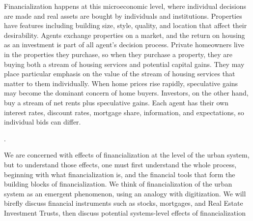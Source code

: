 Financialization happens at this microeconomic level, where individual decisions are made and real assets are bought by individuals and institutions. 
Properties have features including building size, style, quality, and location that affect their desirability. 
Agents exchange properties on a market,  
and the return on housing as an investment is part of all agent's decision process. 
Private homeowners live in the properties they purchase, so when they purchase a property, they are buying both a stream of housing services and potential capital gains. %
They may place particular emphasis on the value of the stream of housing services that matter to them individually. When home prices rise rapidly, speculative gains may become the dominant concern of home buyers. 
Investors, on the other hand, buy a stream of net rents plus speculative gains.
Each agent has their own interest rates, discount rates, mortgage share, information, and expectations, so individual bids can differ. 



.

We are concerned with  effects of financialization at the level of the urban system, but to understand those effects, one must first understand the whole process, beginning with what financialization is, and the financial tools that form the building blocks of financialization. 
We think of financialization of the urban system as an \gls{emergent} phenomenon, using an analogy with digitization. We will birefly discuss financial instruments such as stocks, mortgages, and Real Estate Investment Trusts, then discuss potential systems-level effects of financialization

